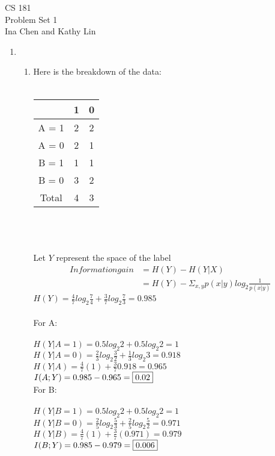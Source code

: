 \documentclass[12pt]{article}
\begin{document}
\begin{center}
CS 181\\
Problem Set 1\\
Ina Chen and Kathy Lin
\end{center}

\begin{enumerate}

	\item 
		\begin{enumerate}
			\item Here is the breakdown of the data:\\\\
				\begin{tabular}{|c|c|c|}
        				\hline
        				~            & 1 & 0 \\ \hline
        				A = 1 & 2      & 2      \\ 
        				A = 0 & 2      & 1      \\
        				\hline
        				B = 1 & 1      & 1      \\ 
        				B = 0 & 3      & 2      \\
        				\hline
					Total & 4      & 3      \\
        				\hline
    				\end{tabular}
\\\\\\Let $Y$ represent the space of the label
				\begin{align*}Information gain &= H(Y) - H(Y|X)\\
							& = H(Y) -\Sigma_{x,y}p(x|y)log_{2}\frac{1}{p(x|y)}\end{align*}
				$H(Y) = \frac{4}{7}log_{2}\frac{7}{4} + \frac{3}{7}log_{2}\frac{7}{3} = 0.985$\\\\
				For A:\\\\
				$H(Y|A = 1) = 0.5log_{2}2 + 0.5log_{2}2 = 1$\\
				$H(Y|A = 0) = \frac{2}{3}log_{2}\frac{3}{2} + \frac{1}{3}log_{2}3 = 0.918$\\
				$H(Y|A) = \frac{4}{7}(1) + \frac{3}{7}0.918 = 0.965$\\
				$I(A ; Y) = 0.985 - 0.965 = \fbox{0.02}$\\

				For B:\\\\
				$H(Y|B = 1) = 0.5log_{2}2 + 0.5log_{2}2 = 1$\\
				$H(Y|B = 0) = \frac{2}{5}log_{2}\frac{5}{3} + \frac{2}{5}log_{2}\frac{5}{2} = 0.971$\\
				$H(Y|B) = \frac{4}{7}(1) + \frac{3}{7}(0.971) = 0.979$\\
				$I(B ; Y) = 0.985 - 0.979 = \fbox{0.006}$\\


\end{enumerate}
\end{enumerate}
\end{document}
